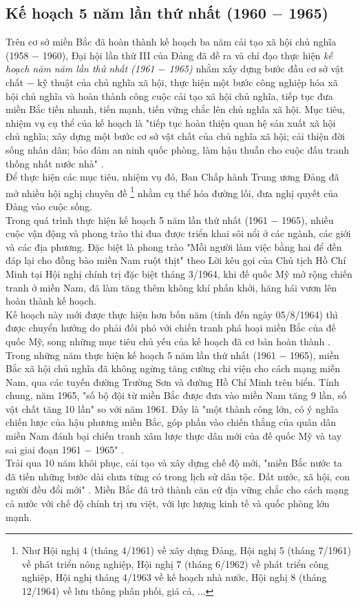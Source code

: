 \subsection{Kế hoạch 5 năm lần thứ nhất (1960 $-$ 1965)}
Trên cơ sở miền Bắc đã hoàn thành kế hoạch ba năm cải tạo xã hội chủ nghĩa (1958 $-$ 1960), Đại hội lần thứ III của Đảng đã đề ra và chỉ đạo thực hiện \textit{kế hoạch năm năm lần thứ nhất (1961 $-$ 1965)} nhằm xây dựng bước đầu cơ sở vật chất $-$ kỹ thuật của chủ nghĩa xã hội, thực hiện một bước công nghiệp hóa xã hội chủ nghĩa và hoàn thành công cuộc cải tạo xã hội chủ nghĩa, tiếp tục đưa miền Bắc tiến nhanh, tiến mạnh, tiến vững chắc lên chủ nghĩa xã hội. Mục tiêu, nhiệm vụ cụ thể của kế hoạch là "tiếp tục hoàn thiện quan hệ sản xuất xã hội chủ nghĩa; xây dựng một bước cơ sở vật chất của chủ nghĩa xã hội; cải thiện đời sống nhân dân; bảo đảm an ninh quốc phòng, làm hậu thuẫn cho cuộc đấu tranh thống nhất nước nhà" \supercite{giaotrinh}. \\
Để thực hiện các mục tiêu, nhiệm vụ đó, Ban Chấp hành Trung ương Đảng đã mở nhiều hội nghị chuyên đề \footnote{Như Hội nghị 4 (tháng 4/1961) về xây dựng Đảng, Hội nghị 5 (tháng 7/1961) về phát triển nông nghiệp, Hội nghị 7 (tháng 6/1962) về phát triển công nghiệp, Hội nghị tháng 4/1963 về kế hoạch nhà nước, Hội nghị 8 (tháng 12/1964) về lưu thông phân phối, giá cả, ...} nhằm cụ thể hóa đường lối, đưa nghị quyết của Đảng vào cuộc sống.\\
Trong quá trình thực hiện kế hoạch 5 năm lần thứ nhất (1961 $-$ 1965), nhiều cuộc vận động và phong trào thi đua được triển khai sôi nổi ở các ngành, các giới và các địa phương. Đặc biệt là phong trào "Mỗi người làm việc bằng hai để đền đáp lại cho đồng bào miền Nam ruột thịt" theo Lời kêu gọi của Chủ tịch Hồ Chí Minh tại Hội nghị chính trị đặc biệt tháng 3/1964, khi đế quốc Mỹ mở rộng chiến tranh ở miền Nam, đã làm tăng thêm không khí phấn khởi, hăng hái vươn lên hoàn thành kế hoạch.\\
Kế hoạch này mới được thực hiện hơn bốn năm (tính đến ngày 05/8/1964) thì được chuyển hướng do phải đối phó với chiến tranh phá hoại miền Bắc của đế quốc Mỹ, song những mục tiêu chủ yếu của kế hoạch đã cơ bản hoàn thành \supercite{giaotrinh}.\\
Trong những năm thực hiện kế hoạch 5 năm lần thứ nhất (1961 $-$ 1965), miền Bắc xã hội chủ nghĩa đã không ngừng tăng cường chi viện cho cách mạng miền Nam, qua các tuyến đường Trường Sơn và đường Hồ Chí Minh trên biển. Tính chung, năm 1965, "số bộ đội từ miền Bắc được đưa vào miền Nam tăng 9 lần, số vật chất tăng 10 lần" \supercite{giaotrinh} so với năm 1961. Đây là "một thành công lớn, có ý nghĩa chiến lược của hậu phương miền Bắc, góp phần vào chiến thắng của quân dân miền Nam đánh bại chiến tranh xâm lược thực dân mới của đế quốc Mỹ và tay sai giai đoạn 1961 $-$ 1965" \supercite{giaotrinh}.\\
Trải qua 10 năm khôi phục, cải tạo và xây dựng chế độ mới, "miền Bắc nước ta đã tiến những bước dài chưa từng có trong lịch sử dân tộc. Đất nước, xã hội, con người đều đổi mới" \supercite{HCMtt14}. Miền Bắc đã trở thành căn cứ địa vững chắc cho cách mạng cả nước với chế độ chính trị ưu việt, với lực lượng kinh tế và quốc phòng lớn mạnh.